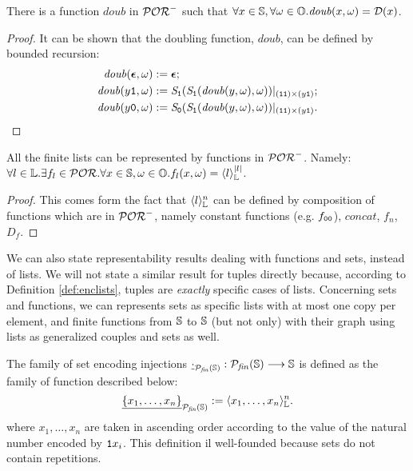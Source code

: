 \begin{lemma}
  \label{lemma:dfinpor}
  There is a function $\mathit{doub}$ in $\mathcal{POR}^-$ such that
  $\forall x \in \mathbb{S}, \forall \omega \in \mathbb{O}. \mathit{doub}(x, \omega)=\mathcal D(x)$.
\end{lemma}
\begin{proof}

  It can be shown that the
  {doubling function,
  $\mathit{doub}$,} can be defined by bounded recursion:
  \begin{align*}
  \mathit{doub}(\bm{\epsilon},\omega) &:= \bm{\epsilon} ;\\
  \mathit{doub}(y\mathtt{1},\omega) &:=
  {\emph{S}_{\mathtt{1}}(\emph{S}_{\mathtt{1}}(\mathit{doub}(y,\omega),
  \omega))}|_{(\mathtt{1}\mathtt{1})\times (y\mathtt{1})}; \\
  \mathit{doub}(y\mathtt{0},\omega) &:=
  {\emph{S}_{\mathtt{0}}(\emph{S}_{\mathtt{1}}
  (\mathit{doub}(y,\omega),\omega))}|_{(\mathtt{1}\mathtt{1})\times
  (y\mathtt{1})}.
  \end{align*}
\end{proof}
%
\begin{remark}
  \label{rem:listrepr}
  All the finite lists can be represented by functions in $\mathcal{POR}^-$. Namely:
  $\forall l \in \mathbb{L}. \exists f_l \in \mathcal{POR}. \forall x \in \mathbb{S}, \omega \in \mathbb{O}.
  f_l(x, \omega) = \langle{l}\rangle^{|l|}_{\mathbb{L}}$.
\end{remark}
\begin{proof}
  This comes form the fact that $\langle{l}\rangle^{n}_{\mathbb{L}}$ can be defined by composition
  of functions which are in $\mathcal{POR}^-$, namely
  constant functions (e.g. $f_{\mathtt{0}\mathtt{0}}$),  $\mathit{concat}$, $f_n$, $D_f$.
\end{proof}

We can also state representability results dealing with
functions and sets, instead of lists. We will not state a similar result for tuples directly
because, according to Definition \ref{def:enclists}, tuples are \emph{exactly}
specific cases of lists.
%
Concerning sets and functions, we can represents sets as specific
lists with at most
one copy per element, and finite functions from $\mathbb{S}$ to $\mathbb{S}$ (but not only)
with their graph using lists as generalized couples and sets as well.
%
\begin{defn}
  \label{def:setenc}
The family of set encoding injections
${\underline{\cdot}}_{\mathcal P_\mathit{fin}(\mathbb{S})}:   \mathcal P_\mathit{fin}(\mathbb{S}) \longrightarrow \mathbb{S}$
is defined as the family of function described below:
$$
{\underline{\{x_1,\ldots, x_n\}}}_{\mathcal P_\mathit{fin}(\mathbb{S})}
:= \langle{x_1,\ldots, x_n}\rangle^{n}_{\mathbb{L}}.
$$
where $x_1, \ldots, x_n$ are taken in ascending order according to the value
of the natural number encoded by $\mathtt{1} x_i$. This definition il well-founded
because sets do not contain repetitions.
\end{defn}

